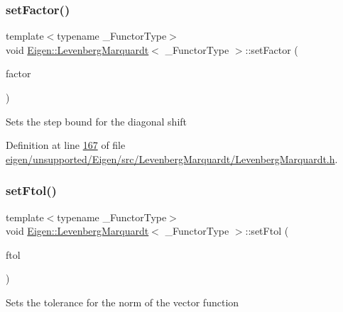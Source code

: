 \subsubsection{\texorpdfstring{set\+Factor()}{setFactor()}\hspace{0.1cm}{\footnotesize\ttfamily [2/2]}}
{\footnotesize\ttfamily template$<$typename \+\_\+\+Functor\+Type$>$ \\
void \hyperlink{class_eigen_1_1_levenberg_marquardt}{Eigen\+::\+Levenberg\+Marquardt}$<$ \+\_\+\+Functor\+Type $>$\+::set\+Factor (\begin{DoxyParamCaption}\item[{Real\+Scalar}]{factor }\end{DoxyParamCaption})\hspace{0.3cm}{\ttfamily [inline]}}

Sets the step bound for the diagonal shift 

Definition at line \hyperlink{eigen_2unsupported_2_eigen_2src_2_levenberg_marquardt_2_levenberg_marquardt_8h_source_l00167}{167} of file \hyperlink{eigen_2unsupported_2_eigen_2src_2_levenberg_marquardt_2_levenberg_marquardt_8h_source}{eigen/unsupported/\+Eigen/src/\+Levenberg\+Marquardt/\+Levenberg\+Marquardt.\+h}.

\mbox{\label{class_eigen_1_1_levenberg_marquardt_a09c0852c6a4534b84a16ac5d9c631c12}} 
\subsubsection{\texorpdfstring{set\+Ftol()}{setFtol()}\hspace{0.1cm}{\footnotesize\ttfamily [1/2]}}
{\footnotesize\ttfamily template$<$typename \+\_\+\+Functor\+Type$>$ \\
void \hyperlink{class_eigen_1_1_levenberg_marquardt}{Eigen\+::\+Levenberg\+Marquardt}$<$ \+\_\+\+Functor\+Type $>$\+::set\+Ftol (\begin{DoxyParamCaption}\item[{Real\+Scalar}]{ftol }\end{DoxyParamCaption})\hspace{0.3cm}{\ttfamily [inline]}}

Sets the tolerance for the norm of the vector function 

